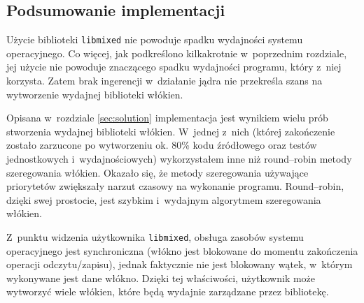 \documentclass[12pt]{mwart}
\newcommand{\code}{\texttt}
\begin{document}
\subsection{Podsumowanie implementacji}
\indent
  Użycie biblioteki \code{libmixed} nie powoduje spadku wydajności systemu operacyjnego. 
  Co więcej, jak podkreślono kilkakrotnie w~poprzednim rozdziale, jej użycie nie powoduje
  znaczącego spadku wydajności programu, który z~niej korzysta. 
  Zatem brak ingerencji w~działanie jądra nie przekreśla szans na wytworzenie wydajnej biblioteki włókien.
\par
%
\indent
  Opisana w~rozdziale \ref{sec:solution} implementacja jest wynikiem wielu prób stworzenia wydajnej biblioteki włókien. W~jednej z~nich (której zakończenie zostało zarzucone
  po wytworzeniu ok. 80\% kodu źródłowego oraz testów jednostkowych i~wydajnościowych) wykorzystałem inne niż round--robin metody szeregowania włókien.
  Okazało się, że metody szeregowania używające priorytetów zwiększały narzut czasowy na wykonanie programu. Round--robin, dzięki swej prostocie, jest szybkim 
  i~wydajnym algorytmem szeregowania włókien.
\par
%
\indent
  Z~punktu widzenia użytkownika \code{libmixed}, obsługa zasobów systemu operacyjnego jest synchroniczna (włókno jest blokowane do momentu zakończenia operacji odczytu/zapisu),
  jednak faktycznie nie jest blokowany wątek, w~którym wykonywane jest dane włókno.
  Dzięki tej właściwości, użytkownik może wytworzyć wiele włókien, które będą wydajnie zarządzane przez bibliotekę.
\par
\end{document}
